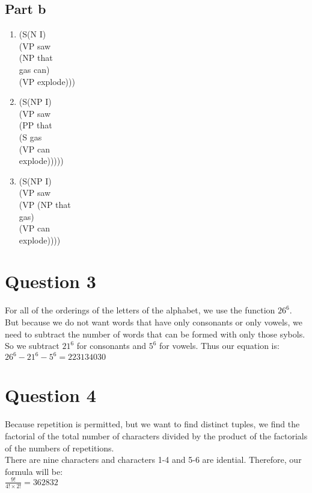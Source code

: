 \documentclass[10pt]{article}
\begin{document}
\subsection*{Part b}
\noindent
\begin{enumerate}
\item
(S\tab{}(N I)\\
\tab{}\tab{}(VP saw\\
\tab{}\tab{}\tab{}(NP that\\
\tab{}\tab{}\tab{}\tab{}gas can)\\
\tab{}\tab{}\tab{}(VP explode)))

\item 
(S\tab{}(NP I)\\
\tab{}\tab{}(VP saw\\
\tab{}\tab{}\tab{}(PP that\\
\tab{}\tab{}\tab{}\tab{}(S gas\\
\tab{}\tab{}\tab{}\tab{}\tab{}(VP can\\
\tab{}\tab{}\tab{}\tab{}\tab{}\tab{}explode)))))

\item
(S\tab{}(NP I)\\
\tab{}\tab{}(VP saw\\
\tab{}\tab{}\tab{}(VP (NP that\\
\tab{}\tab{}\tab{}\tab{}\tab{}gas)\\
\tab{}\tab{}\tab{}\tab{}(VP can\\
\tab{}\tab{}\tab{}\tab{}\tab{}explode))))

\end{enumerate}

\section*{Question 3}
\noindent
For all of the orderings of the letters of the alphabet, we use the function $ 26^{6} $. But because we do not want words that have only consonants or only vowels, we need to subtract the number of words that can be formed with only those sybols. So we subtract $ 21^{6} $ for consonants and $ 5^{6} $ for vowels. Thus our equation is:\\
$ 26^{6} - 21^{6} - 5^{6} = 223134030 $

\section*{Question 4}
\noindent
Because repetition is permitted, but we want to find distinct tuples, we find the factorial of the total number of characters divided by the product of the factorials of the numbers of repetitions.\\
\noindent
There are nine characters and characters 1-4 and 5-6 are idential. Therefore, our formula will be:\\
\noindent
$ \frac{9!}{4! \times 2!} = 362832 $
\end{document}
